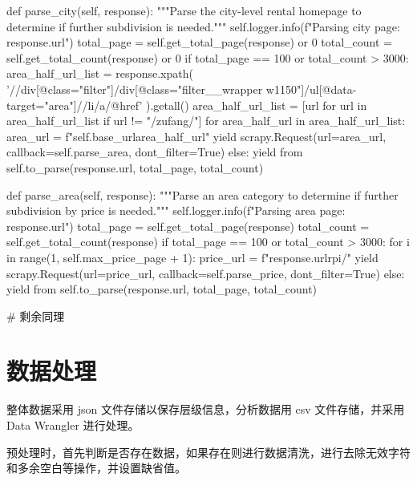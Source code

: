 \begin{python3code}
    def parse_city(self, response):
        """Parse the city-level rental homepage to determine if further subdivision is needed."""
        self.logger.info(f"Parsing city page: {response.url}")
        total_page = self.get_total_page(response) or 0
        total_count = self.get_total_count(response) or 0
        if total_page == 100 or total_count > 3000:
            area_half_url_list = response.xpath(
                '//div[@class="filter"]/div[@class="filter__wrapper w1150"]/ul[@data-target="area"]//li/a/@href'
            ).getall()
            area_half_url_list = [url for url in area_half_url_list if url != "/zufang/"]
            for area_half_url in area_half_url_list:
                area_url = f"{self.base_url}{area_half_url}"
                yield scrapy.Request(url=area_url, callback=self.parse_area, dont_filter=True)
        else:
            yield from self.to_parse(response.url, total_page, total_count)

    def parse_area(self, response):
        """Parse an area category to determine if further subdivision by price is needed."""
        self.logger.info(f"Parsing area page: {response.url}")
        total_page = self.get_total_page(response)
        total_count = self.get_total_count(response)
        if total_page == 100 or total_count > 3000:
            for i in range(1, self.max_price_page + 1):
                price_url = f"{response.url}rp{i}/"
                yield scrapy.Request(url=price_url, callback=self.parse_price, dont_filter=True)
        else:
            yield from self.to_parse(response.url, total_page, total_count)

    # 剩余同理
\end{python3code}

\section{数据处理}

整体数据采用 json 文件存储以保存层级信息，分析数据用 csv 文件存储，并采用 Data Wrangler 进行处理。

预处理时，首先判断是否存在数据，如果存在则进行数据清洗，进行去除无效字符和多余空白等操作，并设置缺省值。

